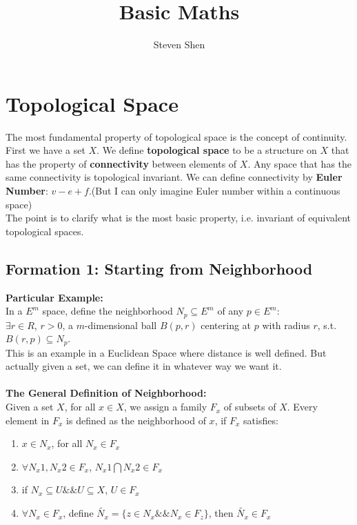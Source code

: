 \documentclass[a4paper, 12pt]{article}
\title{\textbf{Basic Maths}}
\author{Steven Shen}
\begin{document}
\maketitle

\section{Topological Space}
The most fundamental property of topological space is the concept of continuity. \\
First we have a set $X$. We define \textbf{topological space} to be a structure on $X$ that has the property of \textbf{connectivity} between elements of $X$. Any space that has the same connectivity is topological invariant. We can define connectivity by \textbf{Euler Number}: $v - e + f$.(But I can only imagine Euler number within a continuous space)\\
\indent The point is to clarify what is the most basic property, i.e. invariant of equivalent topological spaces.

\subsection{Formation 1: Starting from Neighborhood}
\textbf{Particular Example: }\\
In a $E^m$ space, define the neighborhood $N_p \subseteq E^m$ of any $p \in E^m$: \\
$\exists r \in R$, $r>0$, a $m$-dimensional ball $B(p, r)$ centering at $p$ with radius $r$, s.t. $B(r, p) \subseteq N_p$.\\
This is an example in a Euclidean Space where distance is well defined. But actually given a set, we can define it in whatever way we want it.\\
\\
\indent \textbf{The General Definition of Neighborhood: }\\
Given a set $X$, for all $x \in X$, we assign a family $F_x$ of subsets of $X$. Every element in $F_x$ is defined as the neighborhood of $x$, if $F_x$ satisfies:
\begin{enumerate}
	\item $x \in N_x$, for all $N_x \in F_x$
	\item $\forall N_x1, N_x2 \in F_x$, $N_x1 \bigcap N_x2 \in F_x$
	\item if $N_x \subseteq U \&\& U \subseteq X$, $U \in F_x$
	\item $\forall N_x \in F_x$, define $\tilde{N_x} = \{z \in N_x \&\& N_x \in F_z \}$, then $\tilde{N_x} \in F_x$
\end{enumerate}
\end{document}
